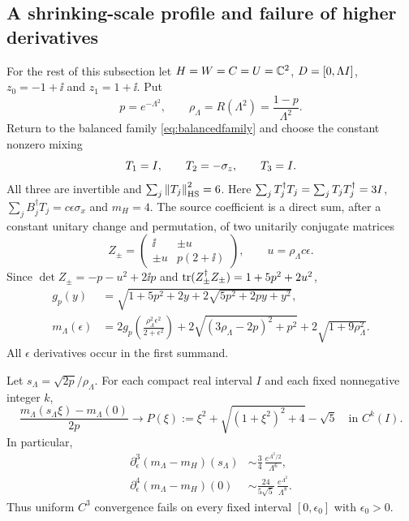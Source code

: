\subsection{A shrinking-scale profile and failure of higher derivatives}
For the rest of this subsection let $H=W=C=U=\mathbb C^2$,
$D=[0,\Lambda I]$, $z_0=-1+\ii$ and $z_1=1+\ii$. Put
\[
 p=e^{-\Lambda^2},\qquad
 \rho_\Lambda=R(\Lambda^2)=\frac{1-p}{\Lambda^2}.
\]
Return to the balanced family \eqref{eq:balancedfamily} and choose the constant nonzero mixing
\begin{equation}\label{eq:profilemixing}
 T_1=I,\qquad T_2=-\sigma_z,\qquad T_3=I .
\end{equation}
All three are invertible and $\sum_j\left\lVert T_j\right\rVert_{\mathrm{HS}}^2=6$.
Here $\sum_jT_j^\dagger T_j=\sum_jT_jT_j^\dagger=3I$,
$\sum_jB_j^\dagger T_j=c\epsilon\sigma_x$ and $m_H=4$.
The source coefficient is a direct sum, after a constant unitary
change and permutation, of two unitarily conjugate matrices
\[
 Z_\pm=\begin{pmatrix}\ii&\pm u\\\pm u&p(2+\ii)\end{pmatrix},
 \qquad u=\rho_\Lambda c\epsilon .
\]
Since $\det Z_\pm=-p-u^2+2\ii p$ and
$\operatorname{tr}(Z_\pm^\dagger Z_\pm)=1+5p^2+2u^2$,
\begin{equation}\label{eq:exactmassprofile}
 \begin{split}
 g_p(y)&=\sqrt{1+5p^2+2y+2\sqrt{5p^2+2py+y^2}},\\
 m_\Lambda(\epsilon)
 &=2g_p\left(\frac{\rho_\Lambda^2\epsilon^2}{2+\epsilon^2}\right)
   +2\sqrt{(3\rho_\Lambda-2p)^2+p^2}+2\sqrt{1+9\rho_\Lambda^2}.
 \end{split}
\end{equation}
All $\epsilon$ derivatives occur in the first summand.

\begin{proposition}\label{prop:profile}
Let $s_\Lambda=\sqrt{2p}/\rho_\Lambda$. For each compact real interval $I$
and each fixed nonnegative integer $k$,
\begin{equation}\label{eq:profilelimit}
 \frac{m_\Lambda(s_\Lambda\xi)-m_\Lambda(0)}{2p}
 \longrightarrow
 P(\xi):=\xi^2+\sqrt{(1+\xi^2)^2+4}-\sqrt5
 \quad\text{in }C^k(I).
\end{equation}
In particular,
\begin{align}
 \partial_\epsilon^3(m_\Lambda-m_H)(s_\Lambda)
 &\sim\frac34\,\frac{e^{\Lambda^2/2}}{\Lambda^6},\label{eq:C3failure}\\
 \partial_\epsilon^4(m_\Lambda-m_H)(0)
 &\sim\frac{24}{5\sqrt5}\,
              \frac{e^{\Lambda^2}}{\Lambda^8}.\label{eq:C4failure}
\end{align}
Thus uniform $C^3$ convergence fails on every fixed interval
$[0,\epsilon_0]$ with $\epsilon_0>0$.
\end{proposition}

